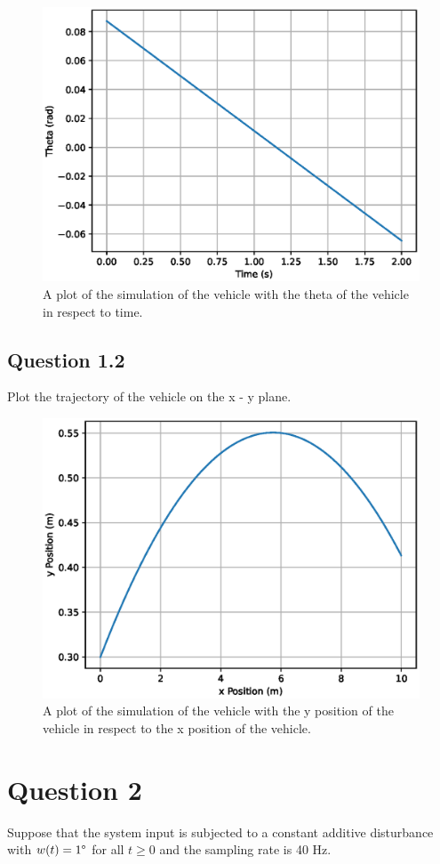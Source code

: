 \documentclass[a4paper,10pt,reqno]{amsart}
\numberwithin{equation}{section}
\begin{document}
    \begin{figure}[h]
        \centering
        \includegraphics[width=0.6\linewidth]{figures/question_1_1_c.eps}
        \caption{A plot of the simulation of the vehicle with the theta of the vehicle in respect to time.}
    \end{figure}
    
    \clearpage
    
    \subsection{Question 1.2}
    Plot the trajectory of the vehicle on the x - y plane.
    
    \begin{figure}[h]
        \centering
        \includegraphics[width=0.6\linewidth]{figures/question_1_2.eps}
        \caption{A plot of the simulation of the vehicle with the y position of the vehicle in respect to the x position of the vehicle.}
    \end{figure}
    
\clearpage
    
\section{Question 2}\label{sec:q2}
Suppose that the system input is subjected to a constant additive disturbance with \(w(t) = 1\degree\) for all \(t \geq 0\) and the sampling rate is 40 Hz.
\end{document}
